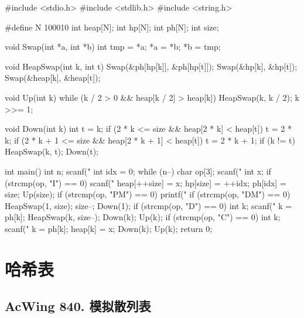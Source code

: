 \begin{mycpptwocol}[可修改任意元素的堆]
#include <stdio.h>
#include <stdlib.h>
#include <string.h>

#define N 100010
int heap[N];
int hp[N];
int ph[N];
int size;

void Swap(int *a, int *b)
{
    int tmp = *a;
    *a = *b;
    *b = tmp;
}

void HeapSwap(int k, int t)
{
    Swap(&ph[hp[k]], &ph[hp[t]]);
    Swap(&hp[k], &hp[t]);
    Swap(&heap[k], &heap[t]);
}

void Up(int k)
{
    while (k / 2 > 0 && heap[k / 2] > heap[k]) {
        HeapSwap(k, k / 2);
        k >>= 1;
    }
}

void Down(int k)
{
    int t = k;
    if (2 * k <= size && heap[2 * k] < heap[t]) {
        t = 2 * k;
    }
    if (2 * k + 1 <= size && heap[2 * k + 1] < heap[t]) {
        t = 2 * k + 1;
    }
    if (k != t) {
        HeapSwap(k, t);
        Down(t);
    }
}

int main()
{
    int n;
    scanf("%
    int idx = 0;
    while (n--) {
        char op[3];
        scanf("%
        int x;
        if (strcmp(op, "I") == 0) {
            scanf("%
            heap[++size] = x;
            hp[size] = ++idx;
            ph[idx] = size;
            Up(size);
        }
        if (strcmp(op, "PM") == 0) {
            printf("%
        }
        if (strcmp(op, "DM") == 0) {
            HeapSwap(1, size);
            size--;
            Down(1);
        }
        if (strcmp(op, "D") == 0) {
            int k;
            scanf("%
            k = ph[k];
            HeapSwap(k, size--);
            Down(k);
            Up(k);
        }
        if (strcmp(op, "C") == 0) {
            int k;
            scanf("%
            k = ph[k];
            heap[k] = x;
            Down(k);
            Up(k);
        }
    }
    return 0;
}
\end{mycpptwocol}

\section{哈希表}
\subsection{AcWing 840. 模拟散列表}

